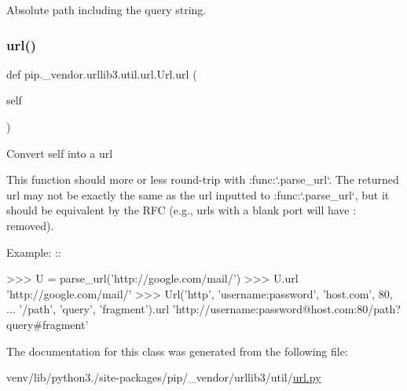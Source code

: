 \begin{DoxyVerb}Absolute path including the query string.\end{DoxyVerb}
 \mbox{\label{classpip_1_1__vendor_1_1urllib3_1_1util_1_1url_1_1Url_a412b7e3ce12f35eb2f203ab2c9c142d4}} 
\subsubsection{\texorpdfstring{url()}{url()}}
{\footnotesize\ttfamily def pip.\+\_\+vendor.\+urllib3.\+util.\+url.\+Url.\+url (\begin{DoxyParamCaption}\item[{}]{self }\end{DoxyParamCaption})}

\begin{DoxyVerb}Convert self into a url

This function should more or less round-trip with :func:`.parse_url`. The
returned url may not be exactly the same as the url inputted to
:func:`.parse_url`, but it should be equivalent by the RFC (e.g., urls
with a blank port will have : removed).

Example: ::

    >>> U = parse_url('http://google.com/mail/')
    >>> U.url
    'http://google.com/mail/'
    >>> Url('http', 'username:password', 'host.com', 80,
    ... '/path', 'query', 'fragment').url
    'http://username:password@host.com:80/path?query#fragment'
\end{DoxyVerb}
 

The documentation for this class was generated from the following file\+:\begin{DoxyCompactItemize}
\item 
venv/lib/python3./site-\/packages/pip/\+\_\+vendor/urllib3/util/\hyperlink{url_8py}{url.\+py}\end{DoxyCompactItemize}

